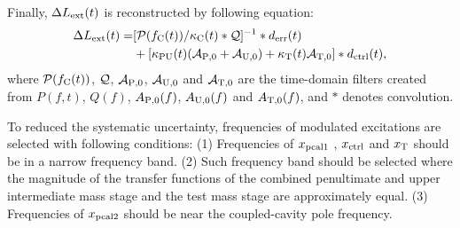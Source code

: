 Finally, $\Delta L_{\rm ext}(t)$ is reconstructed by following equation:
\begin{eqnarray}
\Delta L_{\rm ext}(t) = &[{\cal P}(f_{\rm C}(t))/ \kappa_{\rm C}(t) * {\cal Q} ]^{-1} * d_{\rm err}(t) \nonumber \\
& + [ 
  \kappa_{\rm PU}(t)({\cal A}_{\rm P,0} + {\cal A}_{\rm U,0}) + \kappa_{\rm T}(t) {\cal A}_{\rm T,0}  
]
* d_{\rm ctrl}(t),
\end{eqnarray}
where ${\cal P}(f_{\rm C}(t))$, ${\cal Q}$, ${\cal A_{\rm P,0}}$, ${\cal A_{\rm U,0}}$ and ${\cal A_{\rm T,0}}$  
are the time-domain filters created from $P(f,t)$, $Q(f)$, $A_{\rm P,0}(f)$, $A_{\rm U,0}(f)$ and $A_{\rm T,0}(f)$, and $*$ denotes convolution.

To reduced the systematic uncertainty, frequencies of modulated excitations are selected with following conditions:
(1) Frequencies of $x_{\rm pcal1}$ , $x_{\rm ctrl}$ and $x_{\rm T}$ should be in a narrow frequency band.
(2) Such frequency band should be selected where the magnitude of the transfer functions of 
the combined penultimate and upper intermediate mass stage and the test mass stage are 
approximately equal.
(3) Frequencies of $x_{\rm pcal2}$ should be near the coupled-cavity pole frequency.


